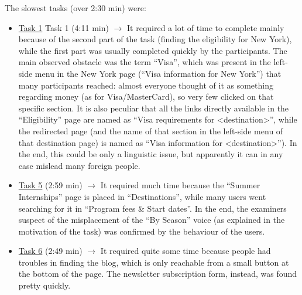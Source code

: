 \documentclass[11pt, letterpaper]{article}
\begin{document}
The slowest tasks (over 2:30 min) were: 
\begin{itemize}
    \item \hyperref[Task:01]{Task 1} Task 1 (4:11 min) $\rightarrow$ It required a lot of time to complete mainly because of the second part of the task (finding the eligibility for New York), while the first part was usually completed quickly by the participants. The main observed obstacle was the term “Visa”, which was present in the left-side menu in the New York page (“Visa information for New York”) that many participants reached: almost everyone thought of it as something regarding money (as for Visa/MasterCard), so very few clicked on that specific section. It is also peculiar that all the links directly available in the “Eligibility” page are named as “Visa requirements for <destination>”, while the redirected page (and the name of that section in the left-side menu of that destination page) is named as “Visa information for <destination>”). In the end, this could be only a linguistic issue, but apparently it can in any case mislead many foreign people. 
    \item \hyperref[Task:05]{Task 5} (2:59 min) $\rightarrow$ It required much time because the “Summer Internships” page is placed in “Destinations”, while many users went searching for it in “Program fees \& Start dates”. In the end, the examiners suspect of the misplacement of the “By Season” voice (as explained in the motivation of the task) was confirmed by the behaviour of the users. 
    \item \hyperref[Task:06]{Task 6} (2:49 min) $\rightarrow$ It required quite some time because people had troubles in finding the blog, which is only reachable from a small button at the bottom of the page. The newsletter subscription form, instead, was found pretty quickly. 
\end{itemize}
\end{document}
